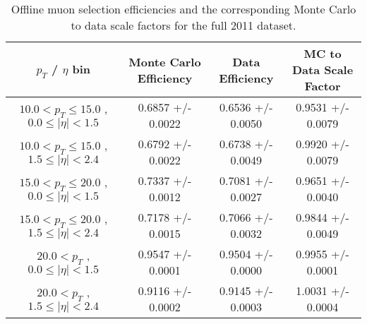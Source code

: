  \begin{table}[!ht]
 \begin{center} 
 \begin{tabular}{|c|c|c|c|}
 \hline
 $p_{T}$ / $\eta$ bin    &  Monte Carlo Efficiency    &  Data Efficiency   &  MC to Data Scale Factor \\   \hline           
$ 10.0 < p_{T} \le  15.0$ , $  0.0  \le |\eta| <   1.5$   &       0.6857 +/- 0.0022   &       0.6536 +/- 0.0050   &       0.9531 +/- 0.0079   \\   
\hline
$ 10.0 < p_{T} \le  15.0$ , $  1.5  \le |\eta| <   2.4$   &       0.6792 +/- 0.0022   &       0.6738 +/- 0.0049   &       0.9920 +/- 0.0079   \\   
\hline
$ 15.0 < p_{T} \le  20.0$ , $  0.0  \le |\eta| <   1.5$   &       0.7337 +/- 0.0012   &       0.7081 +/- 0.0027   &       0.9651 +/- 0.0040   \\   
\hline
$ 15.0 < p_{T} \le  20.0$ , $  1.5  \le |\eta| <   2.4$   &       0.7178 +/- 0.0015   &       0.7066 +/- 0.0032   &       0.9844 +/- 0.0049   \\   
\hline
$ 20.0 < p_{T} $ , $  0.0  \le |\eta| <   1.5$   &       0.9547 +/- 0.0001   &       0.9504 +/- 0.0000   &       0.9955 +/- 0.0001   \\   
\hline
$ 20.0 < p_{T} $ , $  1.5  \le |\eta| <   2.4$   &       0.9116 +/- 0.0002   &       0.9145 +/- 0.0003   &       1.0031 +/- 0.0004   \\   
\hline
\end{tabular}
\caption{Offline muon selection efficiencies and the corresponding Monte Carlo to data scale factors for the
full 2011 dataset.}
\label{tab:eff_mu_offline_Full2011}
\end{center}
\end{table}
